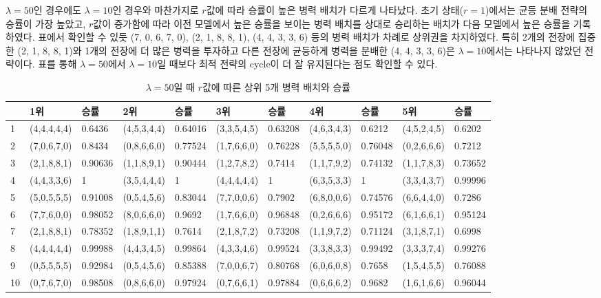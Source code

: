 $\lambda=50$인 경우에도 $\lambda=10$인 경우와 마찬가지로 $r$값에 따라 승률이 높은 병력 배치가 다르게 나타났다. 초기 상태($r=1$)에서는 균등 분배 전략의 승률이 가장 높았고, $r$값이 증가함에 따라 이전 모델에서 높은 승률을 보이는 병력 배치를 상대로 승리하는 배치가 다음 모델에서 높은 승률을 기록하였다. 표에서 확인할 수 있듯 (7, 0, 6, 7, 0), (2, 1, 8, 8, 1), (4, 4, 3, 3, 6) 등의 병력 배치가 차례로 상위권을 차지하였다. 특히 2개의 전장에 집중한 (2, 1, 8, 8, 1)와 1개의 전장에 더 많은 병력을 투자하고 다른 전장에 균등하게 병력을 분배한 (4, 4, 3, 3, 6)은 $\lambda=10$에서는 나타나지 않았던 전략이다. 표를 통해 $\lambda=50$에서 $\lambda=10$일 때보다 최적 전략의 cycle이 더 잘 유지된다는 점도 확인할 수 있다.\\
\begin{table}[htb!]
    \centering
    \caption{$\lambda = 50$일 때 $r$값에 따른 상위 5개 병력 배치와 승률}
    {\scriptsize
    \begin{tabular}{l|ll|ll|ll|ll|ll}
       & 1위       & 승률      & 2위       & 승률      & 3위       & 승률      & 4위       & 승률      & 5위         & 승률      \\ \hline
    1  & (4,4,4,4,4) & 0.6436  & (4,5,3,4,4) & 0.64016 & (3,3,5,4,5) & 0.63208 & (4,6,3,4,3) & 0.6212  & (4,5,2,4,5)   & 0.6202  \\
    2  & (7,0,6,7,0) & 0.8434  & (0,8,6,6,0) & 0.77524 & (1,7,6,6,0) & 0.76228 & (5,5,5,5,0) & 0.76048 & (0,2,6,6,6)   & 0.7212  \\
    3  & (2,1,8,8,1) & 0.90636 & (1,1,8,9,1) & 0.90444 & (1,2,7,8,2) & 0.7414  & (1,1,7,9,2) & 0.74132 & (1,1,7,8,3)   & 0.73652 \\
    4  & (4,4,3,3,6) & 1       & (3,5,4,4,4) & 1       & (4,4,4,4,4) & 1       & (6,3,5,3,3) & 1       & (3,3,4,3,7)   & 0.99996 \\
    5  & (5,0,5,5,5) & 0.91008 & (0,5,4,5,6) & 0.83044 & (7,7,0,0,6) & 0.7902  & (6,8,0,0,6) & 0.74576 & (6,6,4,4,0)   & 0.7286  \\
    6  & (7,7,6,0,0) & 0.98052 & (8,0,6,6,0) & 0.9692  & (1,7,6,6,0) & 0.96848 & (0,2,6,6,6) & 0.95172 & (6,1,6,6,1)   & 0.95124 \\
    7  & (2,1,8,8,1) & 0.78352 & (1,8,9,1,1) & 0.7614  & (2,1,8,7,2) & 0.73208 & (1,1,9,7,2) & 0.71124 & (3,1,8,7,1)   & 0.6998  \\
    8  & (4,4,4,4,4) & 0.99988 & (4,4,3,4,5) & 0.99864 & (4,3,3,4,6) & 0.99524 & (3,3,8,3,3) & 0.99492 & (3,3,3,7,4)   & 0.99276 \\
    9  & (0,5,5,5,5) & 0.92984 & (0,5,4,5,6) & 0.85388 & (7,0,0,6,7) & 0.80768 & (6,0,6,0,8) & 0.7658  & (1,5,4,5,5)   & 0.76088 \\
    10 & (0,7,6,7,0) & 0.98508 & (0,8,6,6,0) & 0.97924 & (0,7,6,6,1) & 0.97884 & (0,6,6,6,2) & 0.9682  & (1,6,1,6,6) & 0.96044
    \end{tabular}
    }
    \label{tab:my_label}
\end{table}